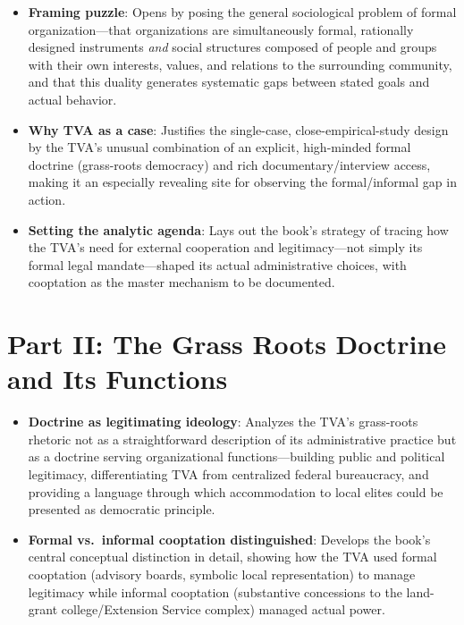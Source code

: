 \documentclass[12pt]{article}
\begin{document}
\begin{itemize}[leftmargin=*, itemsep=4pt]
    \item \textbf{Framing puzzle}: Opens by posing the general sociological problem of formal organization---that organizations are simultaneously formal, rationally designed instruments \emph{and} social structures composed of people and groups with their own interests, values, and relations to the surrounding community, and that this duality generates systematic gaps between stated goals and actual behavior.
    \item \textbf{Why TVA as a case}: Justifies the single-case, close-empirical-study design by the TVA's unusual combination of an explicit, high-minded formal doctrine (grass-roots democracy) and rich documentary/interview access, making it an especially revealing site for observing the formal/informal gap in action.
    \item \textbf{Setting the analytic agenda}: Lays out the book's strategy of tracing how the TVA's need for external cooperation and legitimacy---not simply its formal legal mandate---shaped its actual administrative choices, with cooptation as the master mechanism to be documented.
\end{itemize}

\section{Part II: The Grass Roots Doctrine and Its Functions}

\begin{itemize}[leftmargin=*, itemsep=4pt]
    \item \textbf{Doctrine as legitimating ideology}: Analyzes the TVA's grass-roots rhetoric not as a straightforward description of its administrative practice but as a doctrine serving organizational functions---building public and political legitimacy, differentiating TVA from centralized federal bureaucracy, and providing a language through which accommodation to local elites could be presented as democratic principle.
    \item \textbf{Formal vs.\ informal cooptation distinguished}: Develops the book's central conceptual distinction in detail, showing how the TVA used formal cooptation (advisory boards, symbolic local representation) to manage legitimacy while informal cooptation (substantive concessions to the land-grant college/Extension Service complex) managed actual power.
\end{itemize}
\end{document}
